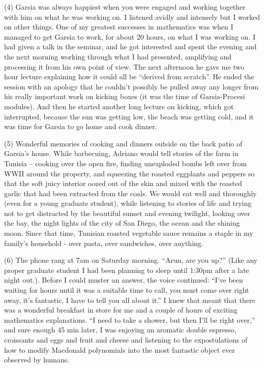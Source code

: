 \documentclass{notices}
\begin{document}
(4) Garsia was always happiest when you were engaged and working
together with him on what he was working on.
I listened avidly and intensely but I worked on other things.  
One of my greatest successes in mathematics was
when I  managed to get Garsia to work,
for about 20 hours, on what I was working on.  
I had given a talk in the seminar, and he got interested
and spent the evening and the next morning
working through what I had presented,
amplifying and processing it from his own point of view.    
The next afternoon he gave me two hour lecture explaining
how it could all be ``derived from scratch''.  
He ended the session with an apology
that he couldn't possibly be pulled away any longer
from his really important work on kicking boxes
(it was the time of Garsia-Procesi modules).  
And then he started another long lecture on kicking,
which got interrupted, because
the sun was getting low,
the beach was getting cold,
and it was time for Garsia to go home and cook dinner.

(5) Wonderful memories of cooking and dinners
outside on the back patio of Garsia's house.  
While barbecuing, Adriano would tell stories of the farm in Tunisia --
cooking over the open fire,
finding unexploded bombs left over from  WWII around the property,
and squeezing the roasted eggplants and peppers
so that the soft juicy interior  oozed out of the skin and
mixed with the  roasted garlic that had been extracted from the coals.  
We would eat well and  thoroughly
(even for a young graduate student),
while listening to stories of life and
trying not to get distracted by the beautiful sunset
and evening twilight, looking over the bay,
the night lights of the city of San Diego,
the ocean and the shining moon.
Since that time, Tunisian roasted vegetable sauce remains
a staple in my family's household - over pasta, over sandwiches, over anything.

(6) The phone rang at 7am on Saturday morning.  ``Arun, are you up?''
(Like any proper graduate student
I had been planning to sleep until 1:30pm after a late night out.).
Before I could muster an answer, the voice continued:
``I've been waiting for hours until it was a suitable time to call,  
you must come over right away, it's fantastic, I have to tell you all about it.''
I knew that meant that there was a wonderful breakfast in store for me
and a couple of hours of exciting mathematics explanations.  
``I need to take a shower, but then I'll be right over,''
and sure enough 45 min later,
I was enjoying an aromatic double espresso, croissants and eggs and fruit and cheese
and listening to the expostulations of how to modify Macdonald polynomials
into the most fantastic object ever observed by humans.
\end{document}
